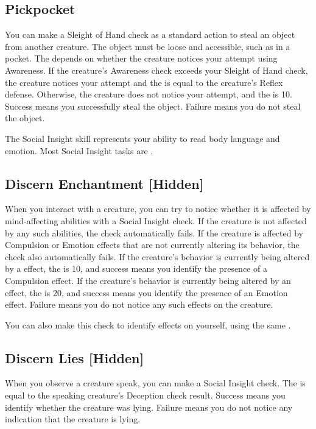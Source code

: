     \subsection{Pickpocket}
        You can make a Sleight of Hand check as a standard action to steal an object from another creature. The object must be loose and accessible, such as in a pocket. The  depends on whether the creature notices your attempt using Awareness. If the creature's Awareness check exceeds your Sleight of Hand check, the creature notices your attempt and the  is equal to the creature's Reflex defense. Otherwise, the creature does not notice your attempt, and the  is 10. Success means you successfully steal the object. Failure means you do not steal the object.

\newpage
{}
        The Social Insight skill represents your ability to read body language and emotion.
        Most Social Insight tasks are .

    \subsection{Discern Enchantment [Hidden]}
        When you interact with a creature, you can try to notice whether it is affected by mind-affecting abilities with a Social Insight check.
        If the creature is not affected by any such abilities, the check automatically fails.
        If the creature is affected by Compulsion or Emotion effects that are not currently altering its behavior, the check also automatically fails.
        If the creature's behavior is currently being altered by a  effect, the  is 10, and success means you identify the presence of a Compulsion effect.
        If the creature's behavior is currently being altered by an  effect, the  is 20, and success means you identify the presence of an Emotion effect.
        Failure means you do not notice any such effects on the creature.

        You can also make this check to identify  effects on yourself, using the same .

    \subsection{Discern Lies [Hidden]}
        When you observe a creature speak, you can make a Social Insight check.
        The  is equal to the speaking creature's Deception check result.
        Success means you identify whether the creature was lying.
        Failure means you do not notice any indication that the creature is lying.

